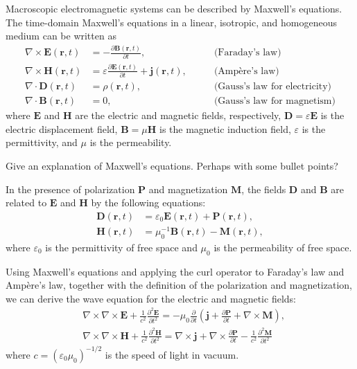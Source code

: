 Macroscopic electromagnetic systems can be described by Maxwell's equations. The time-domain Maxwell's equations in a linear, isotropic, and homogeneous medium can be written as
\begin{align}
    \nabla \times \mathbf{E} (\mathbf{r},t) &= - \frac{\partial \mathbf{B}(\mathbf{r},t)}{\partial t}, \quad \quad &\text{(Faraday's law)} \label{eq:curlE_time}\\
    \nabla \times \mathbf{H} (\mathbf{r},t) &= \varepsilon \frac{\partial \mathbf{E}(\mathbf{r},t)}{\partial t} + \mathbf{j}(\mathbf{r},t), \quad \quad &\text{(Ampère's law)} \label{eq:curlH_time}\\
    \nabla \cdot \mathbf{D} (\mathbf{r},t) &= \rho(\mathbf{r},t), \quad \quad &\text{(Gauss's law for electricity)} \label{eq:divD_time}\\
    \nabla \cdot \mathbf{B} (\mathbf{r},t) &= 0, \quad \quad &\text{(Gauss's law for magnetism)} \label{eq:divB_time}
\end{align}
where $\mathbf{E}$ and $\mathbf{H}$ are the electric and magnetic fields, respectively, 
$\mathbf{D} = \varepsilon \mathbf{E}$ is the electric displacement field, 
$\mathbf{B} = \mu \mathbf{H}$ is the magnetic induction field, 
$\varepsilon$ is the permittivity, and $\mu$ is the permeability.

Give an explanation of Maxwell's equations. Perhaps with some bullet points?

In the presence of polarization $\mathbf{P}$ and magnetization $\mathbf{M}$, 
the fields $\mathbf{D}$ and $\mathbf{B}$ are related to $\mathbf{E}$ and 
$\mathbf{H}$ by the following equations:
\begin{align}
    \mathbf{D}(\mathbf{r}, t) &= \varepsilon_0 \mathbf{E}(\mathbf{r}, t) + \mathbf{P}(\mathbf{r}, t), \\
    \mathbf{H}(\mathbf{r}, t) &= \mu_0^{-1} \mathbf{B}(\mathbf{r}, t) - \mathbf{M}(\mathbf{r}, t),
\end{align}
where $\varepsilon_0$ is the permittivity of free space and $\mu_0$ is the permeability of free space.

Using Maxwell's equations and applying the curl operator to Faraday's law and Ampère's law, 
together with the definition of the polarization and magnetization,
we can derive the wave equation for the electric and magnetic fields:
\begin{equation}
\begin{aligned}
    & \nabla \times \nabla \times \mathbf{E}+\frac{1}{c^2} \frac{\partial^2 \mathbf{E}}{\partial t^2}=-\mu_0 \frac{\partial}{\partial t}\left(\mathbf{j}+\frac{\partial \mathbf{P}}{\partial t}+\nabla \times \mathbf{M}\right), \\
    & \nabla \times \nabla \times \mathbf{H}+\frac{1}{c^2} \frac{\partial^2 \mathbf{H}}{\partial t^2}=\nabla \times \mathbf{j}+\nabla \times \frac{\partial \mathbf{P}}{\partial t}-\frac{1}{c^2} \frac{\partial^2 \mathbf{M}}{\partial t^2}
\end{aligned}
\end{equation}
where $c=(\varepsilon_0 \mu_0)^{-1/2}$ is the speed of light in vacuum.

